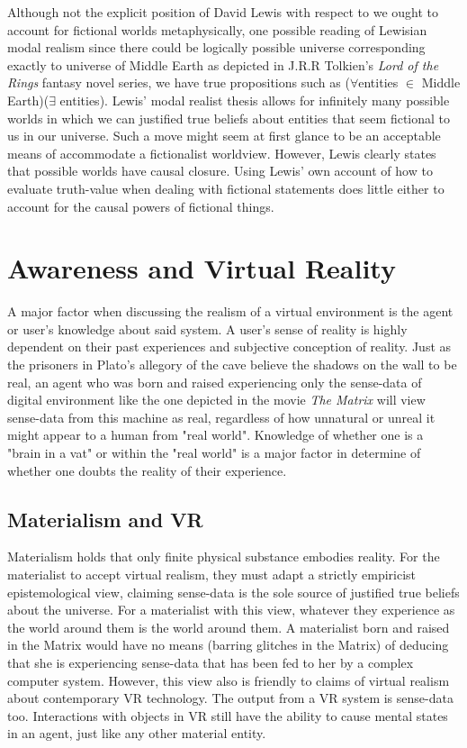 Although not the explicit position of David Lewis with respect to we ought to account for fictional worlds metaphysically, one possible reading of Lewisian modal realism  since there could be logically possible universe corresponding exactly to universe of Middle Earth as depicted in J.R.R Tolkien's \textit{Lord of the Rings} fantasy novel series, we have true propositions such as ($\forall $entities $\in$ Middle Earth)($\exists$ entities). Lewis' modal realist thesis allows for infinitely many possible worlds in which we can justified true beliefs about entities that seem fictional to us in our universe. Such a move might seem at first glance to be an acceptable means of 
accommodate a fictionalist worldview. However, Lewis clearly states that possible worlds have causal closure. Using Lewis' own account of how to evaluate truth-value when dealing with fictional statements does little either to account for the causal powers of fictional things.  



 

  \section{Awareness and Virtual Reality}
A major factor when discussing the realism of a virtual environment is the agent or user's knowledge about said system. A user's sense of reality is highly dependent on their past experiences and subjective conception of reality. Just as the prisoners in Plato's  allegory of the cave believe the shadows on the wall to be real, an agent who was born and raised experiencing only the sense-data of digital environment like the one depicted in the movie \textit{The Matrix} will view sense-data from this machine as real, regardless of how unnatural or unreal it might appear to a human from "real world". Knowledge of whether one is a "brain in a vat" or within the "real world" is a major factor in determine of whether one doubts the reality of their experience. 
 \subsection{Materialism and VR}
Materialism holds that only finite physical substance embodies reality. For the materialist to accept virtual realism, they must adapt a strictly empiricist epistemological view, claiming sense-data is the sole source of justified true beliefs about the universe. For a materialist with this view, whatever they experience as the world around them is the world around them. A materialist born and raised in the Matrix would have no means (barring glitches in the Matrix) of deducing that she is experiencing sense-data that has been fed to her by a complex computer system. However, this view also is friendly to claims of virtual realism about contemporary VR technology. The output from a VR system is sense-data too. Interactions with objects in VR still have the ability to cause mental states in an agent, just like any other material entity.

